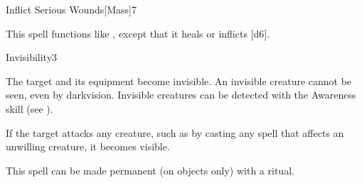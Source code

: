 \begin{spellsection}{Inflict Serious Wounds}[Mass]{7}
    \begin{spellheader}
    \end{spellheader}
    \begin{spellcontent}
        \begin{spelltargetinginfo}
        \end{spelltargetinginfo}
        \begin{spelleffects}
            \spellspecial This spell functions like , except that it heals or inflicts [d6].
        \end{spelleffects}
    \end{spellcontent}
    \begin{spellfooter}
        \miscastexplode
    \end{spellfooter}
\end{spellsection}

\begin{spellsection}{Invisibility}{3}
    \begin{spellheader}
    \end{spellheader}
    \begin{spellcontent}
        \begin{spelltargetinginfo}
        \end{spelltargetinginfo}
        \begin{spelleffects}
            \spelleffect The target and its equipment become invisible. An invisible creature cannot be seen, even by darkvision. Invisible creatures can be detected with the Awareness skill (see ).

            If the target attacks any creature, such as by casting any spell that affects an unwilling creature, it becomes visible.
            \spelldur \durshort \dismissable
        \end{spelleffects}
    \end{spellcontent}
    \begin{spellfooter}
        \spellnotes This spell can be made permanent (on objects only) with a  ritual.
        \miscastrandom
    \end{spellfooter}
\end{spellsection}

